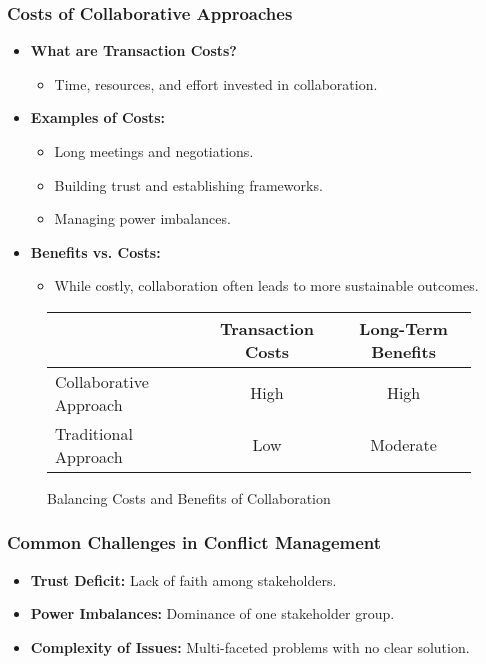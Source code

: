 \documentclass[10pt]{beamer}
\begin{document}
        \begin{frame}
        \frametitle{Costs of Collaborative Approaches}
        \begin{itemize}
            \item \textbf{What are Transaction Costs?}
                \begin{itemize}
                    \item Time, resources, and effort invested in collaboration.
                \end{itemize}
            \item \textbf{Examples of Costs:}
                \begin{itemize}
                    \item Long meetings and negotiations.
                    \item Building trust and establishing frameworks.
                    \item Managing power imbalances.
                \end{itemize}
            \item \textbf{Benefits vs. Costs:}
                \begin{itemize}
                    \item While costly, collaboration often leads to more sustainable outcomes.
                \end{itemize}
        \end{itemize}
        
        \begin{figure}
            \centering
            \begin{tabular}{lcc}
                \toprule
                & Transaction Costs & Long-Term Benefits \\
                \midrule
                Collaborative Approach & High & High \\
                Traditional Approach & Low & Moderate \\
                \bottomrule
            \end{tabular}
            \caption{Balancing Costs and Benefits of Collaboration}
        \end{figure}
        \end{frame}
        
        \begin{frame}
        \frametitle{Common Challenges in Conflict Management}
        \begin{itemize}
            \item \textbf{Trust Deficit:} Lack of faith among stakeholders.
            \item \textbf{Power Imbalances:} Dominance of one stakeholder group.
            \item \textbf{Complexity of Issues:} Multi-faceted problems with no clear solution.
        \end{itemize}
        \end{frame}
\end{document}
